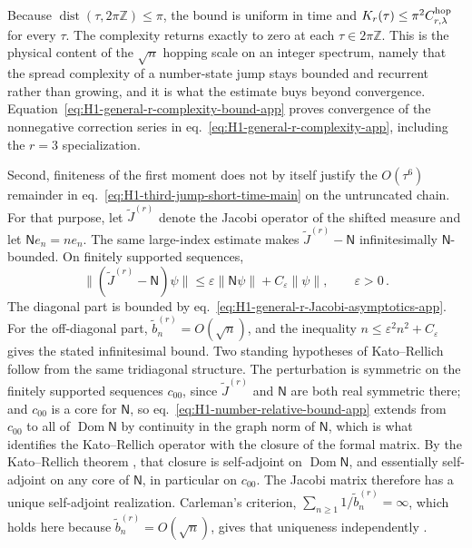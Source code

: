 \documentclass[a4paper,11pt]{article}
\def\Jac{J}%
\theoremstyle{definition}
\theoremstyle{remark}
\newcommand{\Jac}{\mathsf J}
\newcommand{\Dom}{\operatorname{Dom}}
\begin{document}
Because $\operatorname{dist}(\tau,2\pi\mathbb Z)\le\pi$, the bound is uniform in time and
$K_r(\tau)\le\pi^2C_{r,\lambda}^{\rm hop}$ for every $\tau$.  The complexity returns exactly to
zero at each $\tau\in2\pi\mathbb Z$. This is
the physical content of the $\sqrt n$ hopping scale on an integer spectrum, namely that the spread
complexity of a number-state jump stays bounded and recurrent rather than growing, and it is
what the estimate buys beyond convergence. Equation~\eqref{eq:H1-general-r-complexity-bound-app} proves
convergence of the nonnegative correction series in
eq.~\eqref{eq:H1-general-r-complexity-app}, including the \(r=3\)
specialization.

Second, finiteness of the first moment does not by itself justify the $O(\tau^6)$ remainder in eq.~\eqref{eq:H1-third-jump-short-time-main} on the untruncated chain. For
that purpose, let
\(\widetilde{\Jac}^{(r)}\) denote the Jacobi operator of the shifted
measure and let \(\mathsf Ne_n=ne_n\). The same large-index estimate
makes $\widetilde{\Jac}^{(r)}-\mathsf N$ infinitesimally
$\mathsf N$-bounded. On finitely supported sequences,
\begin{equation}
   \|(\widetilde{\Jac}^{(r)}-\mathsf N)\psi\|
   \le
   \varepsilon\|\mathsf N\psi\|
   +C_\varepsilon\|\psi\|,
   \qquad \varepsilon>0\,.
   \label{eq:H1-number-relative-bound-app}
\end{equation}
The diagonal part is bounded by
eq.~\eqref{eq:H1-general-r-Jacobi-asymptotics-app}.  For the
off-diagonal part,
\(\widetilde b_n^{(r)}=O(\sqrt n)\), and the inequality
\(n\le\varepsilon^2n^2+C_\varepsilon\) gives the stated
infinitesimal bound. Two standing hypotheses of Kato--Rellich follow from the same
tridiagonal structure. The perturbation is symmetric on the finitely supported sequences $c_{00}$,
since $\widetilde{\Jac}^{(r)}$ and $\mathsf N$ are both real symmetric there; and $c_{00}$ is a
core for $\mathsf N$, so eq.~\eqref{eq:H1-number-relative-bound-app} extends from $c_{00}$ to all
of $\Dom\mathsf N$ by continuity in the graph norm of $\mathsf N$, which is what identifies the
Kato--Rellich operator with the closure of the formal matrix. 
By the Kato--Rellich theorem \cite{ReedSimonII}, that closure is self-adjoint on \(\Dom\mathsf N\), and essentially
self-adjoint on any core of $\mathsf N$, in particular on $c_{00}$. The Jacobi matrix therefore has
a unique self-adjoint realization. Carleman's criterion,
\(\sum_{n\ge1}1/\widetilde b_n^{(r)}=\infty\), which holds here because
$\widetilde b_n^{(r)}=O(\sqrt n)$, gives that uniqueness independently
\cite{SimonMomentProblem1998}.
\end{document}
